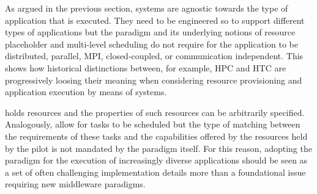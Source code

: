 \documentclass{sig-alternate}
\begin{document}



 As argued in the previous section, \pilot systems are agnostic towards
the type of application that is executed. They need to be engineered so to
support different types of applications but the \pilot paradigm and its
underlying notions of resource placeholder and multi-level scheduling do not
require for the application to be distributed, parallel, MPI, closed-coupled, or
communication independent. This shows how historical distinctions between, for
example, HPC and HTC are progressively loosing their meaning when considering
resource provisioning and application execution by means of \pilot systems.

\pilots holds resources and the properties of such resources can be arbitrarily
specified. Analogously, \pilots allow for tasks to be scheduled but the type of
matching between the requirements of these tasks and the capabilities offered by
the resources held by the pilot is not mandated by the \pilot paradigm itself.
For this reason, adopting the \pilot paradigm for the execution of increasingly
diverse applications should be seen as a set of often challenging implementation
details more than a foundational issue requiring new middleware paradigms.
\end{document}

